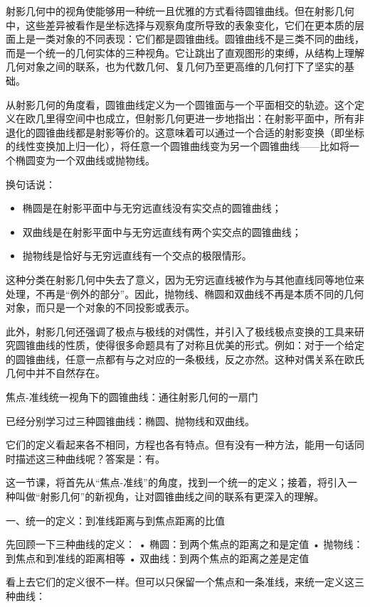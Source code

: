射影几何中的视角使能够用一种统一且优雅的方式看待圆锥曲线。但在射影几何中，这些差异被看作是坐标选择与观察角度所导致的表象变化，它们在更本质的层面上是一类对象的不同表现：它们都是圆锥曲线。圆锥曲线不是三类不同的曲线，而是一个统一的几何实体的三种视角。它让跳出了直观图形的束缚，从结构上理解几何对象之间的联系，也为代数几何、复几何乃至更高维的几何打下了坚实的基础。

从射影几何的角度看，圆锥曲线定义为一个圆锥面与一个平面相交的轨迹。这个定义在欧几里得空间中也成立，但射影几何更进一步地指出：在射影平面中，所有非退化的圆锥曲线都是射影等价的。这意味着可以通过一个合适的射影变换（即坐标的线性变换加上归一化），将任意一个圆锥曲线变为另一个圆锥曲线——比如将一个椭圆变为一个双曲线或抛物线。

换句话说：
\begin{itemize}
\item 椭圆是在射影平面中与无穷远直线没有实交点的圆锥曲线；
\item 双曲线是在射影平面中与无穷远直线有两个实交点的圆锥曲线；
\item 抛物线是恰好与无穷远直线有一个交点的极限情形。
\end{itemize}

这种分类在射影几何中失去了意义，因为无穷远直线被作为与其他直线同等地位来处理，不再是“例外的部分”。因此，抛物线、椭圆和双曲线不再是本质不同的几何对象，而只是一个对象的不同投影或表示。

此外，射影几何还强调了极点与极线的对偶性，并引入了极线极点变换的工具来研究圆锥曲线的性质，使得很多命题具有了对称且优美的形式。例如：对于一个给定的圆锥曲线，任意一点都有与之对应的一条极线，反之亦然。这种对偶关系在欧氏几何中并不自然存在。



焦点-准线统一视角下的圆锥曲线：通往射影几何的一扇门

已经分别学习过三种圆锥曲线：椭圆、抛物线和双曲线。

它们的定义看起来各不相同，方程也各有特点。但有没有一种方法，能用一句话同时描述这三种曲线呢？答案是：有。

这一节课，将首先从“焦点-准线”的角度，找到一个统一的定义；接着，将引入一种叫做“射影几何”的新视角，让对圆锥曲线之间的联系有更深入的理解。


一、统一的定义：到准线距离与到焦点距离的比值

先回顾一下三种曲线的定义：
	•	椭圆：到两个焦点的距离之和是定值
	•	抛物线：到焦点和到准线的距离相等
	•	双曲线：到两个焦点的距离之差是定值

看上去它们的定义很不一样。但可以只保留一个焦点和一条准线，来统一定义这三种曲线：

